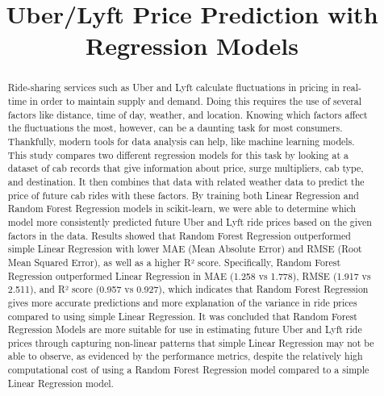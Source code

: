 \documentclass[conference]{IEEEtran}
\begin{document}
\title{Uber/Lyft Price Prediction with Regression Models\\
}

\author{
\and
{}
\and
{}
}

\maketitle

\begin{abstract}
Ride-sharing services such as Uber and Lyft calculate fluctuations in pricing in real-time in order to maintain supply and demand. Doing this requires the use of several factors like distance, time of day, weather, and location. Knowing which factors affect the fluctuations the most, however, can be a daunting task for most consumers. Thankfully, modern tools for data analysis can help, like machine learning models. This study compares two different regression models for this task by looking at a dataset of cab records that give information about price, surge multipliers, cab type, and destination. It then combines that data with related weather data to predict the price of future cab rides with these factors. By training both Linear Regression and Random Forest Regression models in scikit-learn, we were able to determine which model more consistently predicted future Uber and Lyft ride prices based on the given factors in the data. Results showed that Random Forest Regression outperformed simple Linear Regression with lower MAE (Mean Absolute Error) and RMSE (Root Mean Squared Error), as well as a higher R² score. Specifically, Random Forest Regression outperformed Linear Regression in MAE (1.258 vs 1.778), RMSE (1.917 vs 2.511), and R² score (0.957 vs 0.927), which indicates that Random Forest Regression gives more accurate predictions and more explanation of the variance in ride prices compared to using simple Linear Regression. It was concluded that Random Forest Regression Models are more suitable for use in estimating future Uber and Lyft ride prices through capturing non-linear patterns that simple Linear Regression may not be able to observe, as evidenced by the performance metrics, despite the relatively high computational cost of using a Random Forest Regression model compared to a simple Linear Regression model.
\end{abstract}
\end{document}
